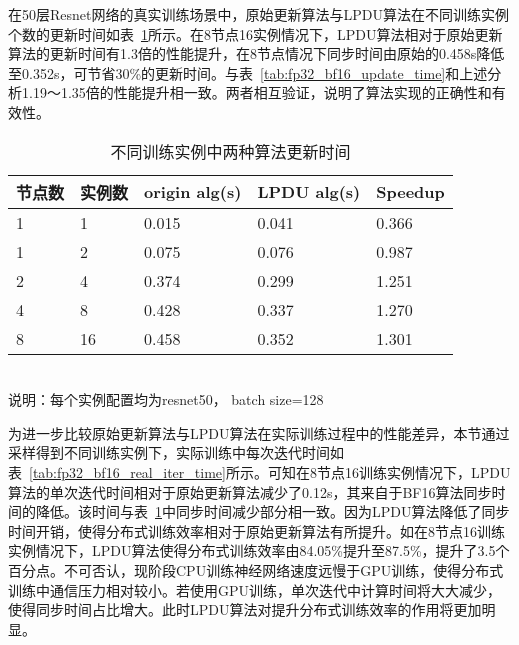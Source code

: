 在50层Resnet网络的真实训练场景中，原始更新算法与LPDU算法在不同训练实例个数的更新时间如表~\ref{tab:fp32_bf16_real_update_time}所示。在8节点16实例情况下，LPDU算法相对于原始更新算法的更新时间有1.3倍的性能提升，在8节点情况下同步时间由原始的0.458s降低至0.352s，可节省30\%的更新时间。与表~\ref{tab:fp32_bf16_update_time}和上述分析1.19～1.35倍的性能提升相一致。两者相互验证，说明了算法实现的正确性和有效性。 

\begin{table}[htbp]
  \centering
  \caption{不同训练实例中两种算法更新时间}
  \label{tab:fp32_bf16_real_update_time}
  \begin{minipage}[t]{0.8\textwidth} 
    \begin{tabularx}{\linewidth}{|l|X|X|X|X|}
      \hline
      节点数 & 实例数 & origin alg(s) & LPDU alg(s) & Speedup\\
      \hline
1 & 1 & 0.015 & 0.041 & 0.366 \\
1 & 2 & 0.075 & 0.076 & 0.987 \\
2 & 4 & 0.374 & 0.299 & 1.251 \\
4 & 8 & 0.428 & 0.337 & 1.270 \\
8 & 16 & 0.458 & 0.352 & 1.301 \\
      \hline
    \end{tabularx}\\[2pt]
    \footnotesize
    说明：每个实例配置均为resnet50， batch size=128\\
  \end{minipage}
\end{table}

为进一步比较原始更新算法与LPDU算法在实际训练过程中的性能差异，本节通过采样得到不同训练实例下，实际训练中每次迭代时间如表~\ref{tab:fp32_bf16_real_iter_time}所示。可知在8节点16训练实例情况下，LPDU算法的单次迭代时间相对于原始更新算法减少了0.12s，其来自于BF16算法同步时间的降低。该时间与表~\ref{tab:fp32_bf16_real_update_time}中同步时间减少部分相一致。因为LPDU算法降低了同步时间开销，使得分布式训练效率相对于原始更新算法有所提升。如在8节点16训练实例情况下，LPDU算法使得分布式训练效率由84.05\%提升至87.5\%，提升了3.5个百分点。不可否认，现阶段CPU训练神经网络速度远慢于GPU训练，使得分布式训练中通信压力相对较小。若使用GPU训练，单次迭代中计算时间将大大减少，使得同步时间占比增大。此时LPDU算法对提升分布式训练效率的作用将更加明显。

